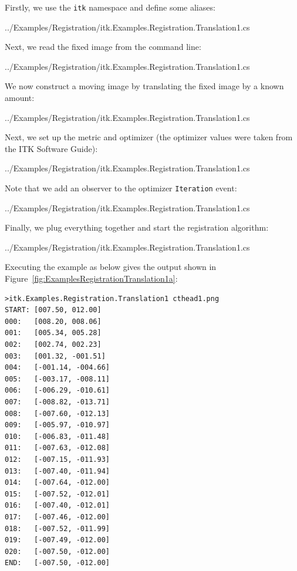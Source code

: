\documentclass{InsightArticle}
\def\code#1{\texttt{#1}}
\begin{document}
Firstly, we use the \code{itk} namespace and define some aliases:
\begin{center}
	
	{../Examples/Registration/itk.Examples.Registration.Translation1.cs}
\end{center}

Next, we read the fixed image from the command line:
\begin{center}
	
	{../Examples/Registration/itk.Examples.Registration.Translation1.cs}
\end{center}

We now construct a moving image by translating the fixed image by a 
known amount:
\begin{center}
	
	{../Examples/Registration/itk.Examples.Registration.Translation1.cs}
\end{center}

Next, we set up the metric and optimizer (the optimizer values were
taken from the ITK Software Guide):
\begin{center}
	
	{../Examples/Registration/itk.Examples.Registration.Translation1.cs}
\end{center}

Note that we add an observer to the optimizer \code{Iteration} event:
\begin{center}
	
	{../Examples/Registration/itk.Examples.Registration.Translation1.cs}
\end{center}

Finally, we plug everything together and start the registration algorithm:
\begin{center}
	
	{../Examples/Registration/itk.Examples.Registration.Translation1.cs}
\end{center}

Executing the example as below gives the output shown in Figure~\ref{fig:ExamplesRegistrationTranslation1a}:

\begin{lstlisting}
>itk.Examples.Registration.Translation1 cthead1.png
START: [007.50, 012.00]
000:   [008.20, 008.06]
001:   [005.34, 005.28]
002:   [002.74, 002.23]
003:   [001.32, -001.51]
004:   [-001.14, -004.66]
005:   [-003.17, -008.11]
006:   [-006.29, -010.61]
007:   [-008.82, -013.71]
008:   [-007.60, -012.13]
009:   [-005.97, -010.97]
010:   [-006.83, -011.48]
011:   [-007.63, -012.08]
012:   [-007.15, -011.93]
013:   [-007.40, -011.94]
014:   [-007.64, -012.00]
015:   [-007.52, -012.01]
016:   [-007.40, -012.01]
017:   [-007.46, -012.00]
018:   [-007.52, -011.99]
019:   [-007.49, -012.00]
020:   [-007.50, -012.00]
END:   [-007.50, -012.00]
\end{lstlisting}
\end{document}
